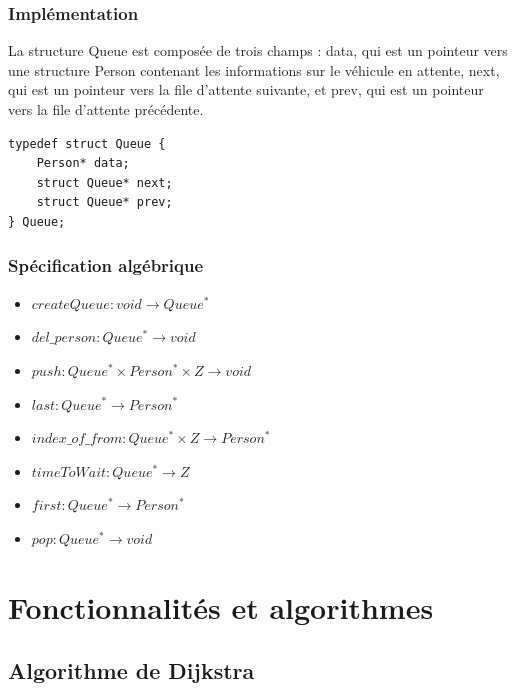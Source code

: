 \documentclass[french,a4paper]{article}
\begin{document}
    \subsubsection{Implémentation}
    La structure Queue est composée de trois champs : data, qui est un pointeur vers une structure Person contenant les informations sur le véhicule en attente, next, qui est un pointeur vers la file d'attente suivante, et prev, qui est un pointeur vers la file d'attente précédente. \\

    \begin{center}
        \begin{lstlisting}[caption=Structure Queue]
typedef struct Queue {
    Person* data;
    struct Queue* next;
    struct Queue* prev;
} Queue;
        \end{lstlisting}
    \end{center}


    \subsubsection{Spécification algébrique}
    \begin{itemize}
        \item $createQueue : void \rightarrow Queue^*$
        \item $del\_person : Queue^* \rightarrow void$
        \item $push : Queue^* \times Person^* \times {Z} \rightarrow void$
        \item $last : Queue^* \rightarrow Person^*$
        \item $index\_of\_from : Queue^* \times {Z} \rightarrow Person^*$
        \item $timeToWait : Queue^* \rightarrow {Z}$
        \item $first : Queue^* \rightarrow Person^*$
        \item $pop : Queue^* \rightarrow void$
    \end{itemize}

    \section{Fonctionnalités et algorithmes}
    \subsection{Algorithme de Dijkstra}
\end{document}
